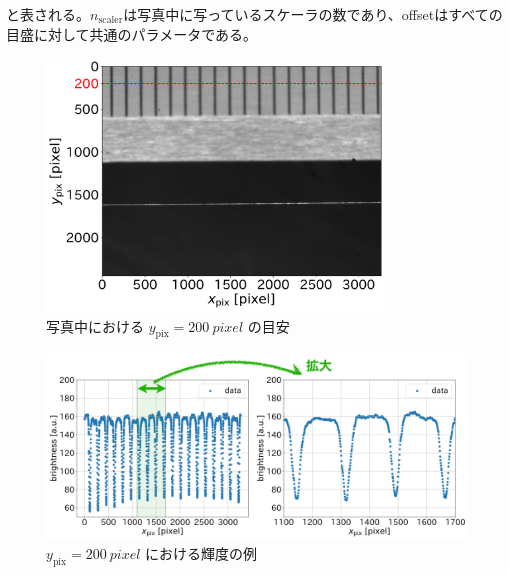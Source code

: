 \documentclass[../../main.tex]{subfiles}
\begin{document}
と表される。$n_{\mathrm{scaler}}$は写真中に写っているスケーラの数であり、offsetはすべての目盛に対して共通のパラメータである。
\begin{figure}[H]
    \centering
    \includegraphics[width=0.8\textwidth]{wiresag/wiresag_scaler_target.pdf}
    \caption{写真中における $y_{\mathrm{pix}}=\SI{200}{pixel}$ の目安}
    \label{fig:wiresag_scaler_target}
\end{figure}
\begin{figure}[H]
    \centering
    \includegraphics[width=1.0\textwidth]{wiresag/wiresag_scaler_brightness.pdf}
    \caption{$y_{\mathrm{pix}}=\SI{200}{pixel}$ における輝度の例}
    \label{fig:wiresag_scaler_brightness}
\end{figure}
\end{document}
